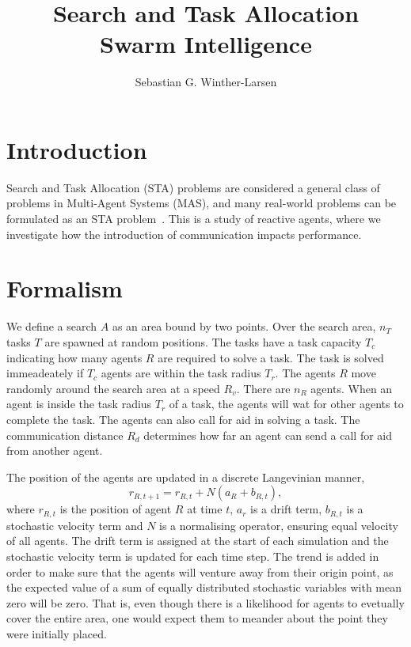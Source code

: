 \documentclass[11pt]{article}
\title{Search and Task Allocation \\
    \small{Swarm Intelligence}}
\author{Sebastian G. Winther-Larsen}
\begin{document}
    
    \maketitle

    \section{Introduction}

    Search and Task Allocation (STA) problems are considered a general class of 
    problems in Multi-Agent Systems (MAS), and many real-world problems can 
    be formulated as an STA problem~\cite{ijspeert2001collaboration}.
    This is a study of reactive agents, where 
    we investigate how the introduction of communication impacts performance.

    \section{Formalism}

    We define a search $A$ as an area bound by two points. Over the search area, 
    $n_T$ tasks $T$ are spawned at random positions. The tasks have a task capacity
    $T_c$ indicating how many agents $R$ are required to solve a task. The task is 
    solved immeadeately if $T_c$ agents are within the task radius $T_r$.
    The agents $R$ move randomly around the search area at a speed $R_v$. There are 
    $n_R$ agents. When an agent is inside the task radius $T_r$ of a task, the agents 
    will wat for other agents to complete the task. The agents can also call for 
    aid in solving a task. The communication distance $R_d$ determines how 
    far an agent can send a call for aid from another agent.

    The position of the agents are updated in a discrete Langevinian manner,
    \begin{equation}
        \label{eq:langevinian}
        r_{R, t+1} = r_{R, t} + N\left(a_R +  b_{R, t}\right),
    \end{equation}
    where $r_{R, t}$ is the position of agent $R$ at time $t$, $a_r$ is a 
    drift term, $b_{R, t}$ is a stochastic velocity term and $N$ is a normalising
    operator, ensuring equal velocity of all agents. The drift term is assigned 
    at the start of each simulation and the stochastic velocity term is updated 
    for each time step. The trend is added in order to make sure that the agents
    will venture away from their origin point, as the expected value of 
    a sum of equally distributed stochastic variables with mean zero will be 
    zero. That is, even though there is a likelihood for agents to evetually 
    cover the entire area, one would expect them to meander about the point 
    they were initially placed.
\end{document}

